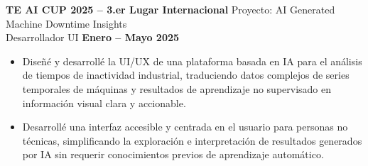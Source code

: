 \documentclass[11pt]{article}
\begin{document}
\textbf{TE AI CUP 2025 -- 3.er Lugar Internacional} \hfill Proyecto: AI Generated Machine Downtime Insights\\
Desarrollador UI \hfill \textbf{Enero -- Mayo 2025}
\vspace{-0.3cm}
\begin{itemize}[leftmargin=*]
    \item Diseñé y desarrollé la UI/UX de una plataforma basada en IA para el análisis de tiempos de inactividad industrial, traduciendo datos complejos de series temporales de máquinas y resultados de aprendizaje no supervisado en información visual clara y accionable.
    
    \vspace{-0.3cm}
    \item Desarrollé una interfaz accesible y centrada en el usuario para personas no técnicas, simplificando la explo\-ra\-ción e interpretación de resultados generados por IA sin requerir conocimientos previos de aprendizaje automático.
    
\end{itemize}
\end{document}

